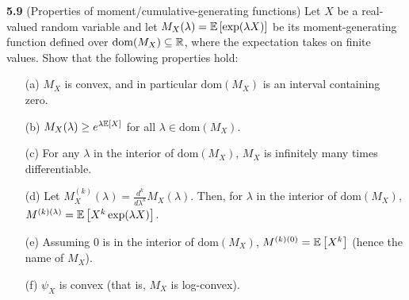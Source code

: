 \noindent\textbf{5.9}
(Properties of moment/cumulative-generating functions) Let $X$ be a real-valued random variable and let $M_X(\lambda) = \mathbb{E} \left[\exp(\lambda X)\right]$ be its moment-generating function defined over $\text{dom}(M_X) \subseteq \mathbb{R}$, where the expectation takes on finite values. Show that the following properties hold:
\begin{enumerate}
	\item[(a)] $M_X$ is convex, and in particular $\text{dom}(M_X)$ is an interval containing zero.
	\item[(b)] $M_X(\lambda) \ge e^{\lambda \mathbb{E} \left[X\right]}$ for all $\lambda \in \text{dom}(M_X)$.
	\item[(c)] For any $\lambda$ in the interior of $\text{dom}(M_X)$, $M_X$ is infinitely many times differentiable.
	\item[(d)] Let $M^{(k)}_X(\lambda) = \frac{d^k}{d\lambda^k}M_X(\lambda)$. Then, for $\lambda$ in the interior of $\text{dom}(M_X)$, $M^{(k)(\lambda)} = \mathbb{E} \left[X^k \exp(\lambda X)\right]$. 
	\item[(e)] Assuming $0$ is in the interior of $\text{dom}(M_X)$, $M^{(k)(0)} = \mathbb{E} \left[X^k\right]$ (hence the name of $M_X$).
	\item[(f)] $\psi_X$ is convex (that is, $M_X$ is log-convex). 
\end{enumerate}

